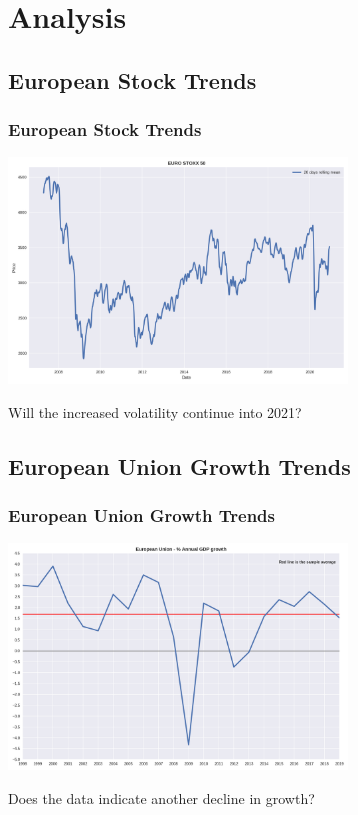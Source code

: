 \documentclass[10pt]{beamer}
\begin{document}
\section{Analysis}
\begin{frame}
\subsection{European Stock Trends}
\frametitle{European Stock Trends}

\begin{center}
\includegraphics[height=6cm]{STOXX50E.png}
\end{center}

Will the increased volatility continue into 2021?

\end{frame}
\begin{frame}
\subsection{European Union Growth Trends}
\frametitle{European Union Growth Trends}

\begin{center}
\includegraphics[height=6cm]{EU_GDP.png}
\end{center}

Does the data indicate another decline in growth?

\end{frame}
\end{document}

